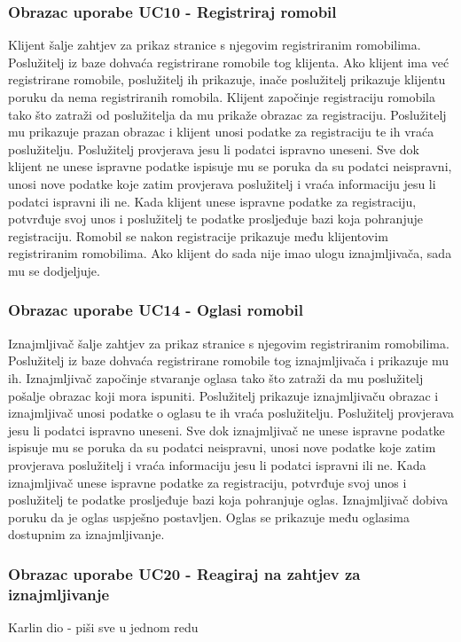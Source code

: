 				\subsubsection{Obrazac uporabe UC10 - Registriraj romobil}
						Klijent šalje zahtjev za prikaz stranice s njegovim registriranim romobilima. Poslužitelj iz baze dohvaća registrirane romobile tog klijenta. Ako klijent ima već registrirane romobile, poslužitelj ih prikazuje, inače poslužitelj prikazuje klijentu poruku da nema registriranih romobila. Klijent započinje registraciju romobila tako što zatraži od poslužitelja da mu prikaže obrazac za registraciju. Poslužitelj mu prikazuje prazan obrazac i klijent unosi podatke za registraciju te ih vraća poslužitelju. Poslužitelj provjerava jesu li podatci ispravno uneseni. Sve dok klijent ne unese ispravne podatke ispisuje mu se poruka da su podatci neispravni, unosi nove podatke koje zatim provjerava poslužitelj i vraća informaciju jesu li podatci ispravni ili ne. Kada klijent unese ispravne podatke za registraciju, potvrđuje svoj unos i poslužitelj te podatke prosljeđuje bazi koja pohranjuje registraciju. Romobil se nakon registracije prikazuje među klijentovim registriranim romobilima. Ako klijent do sada nije imao ulogu iznajmljivača, sada mu se dodjeljuje. 
				
				\eject

				\subsubsection{Obrazac uporabe UC14 - Oglasi romobil}
						Iznajmljivač šalje zahtjev za prikaz stranice s njegovim registriranim romobilima. Poslužitelj iz baze dohvaća registrirane romobile tog iznajmljivača i prikazuje mu ih. Iznajmljivač započinje stvaranje oglasa tako što zatraži da mu poslužitelj pošalje obrazac koji mora ispuniti. Poslužitelj prikazuje iznajmljivaču obrazac i iznajmljivač unosi podatke o oglasu te ih vraća poslužitelju. Poslužitelj provjerava jesu li podatci ispravno uneseni. Sve dok iznajmljivač ne unese ispravne podatke ispisuje mu se poruka da su podatci neispravni, unosi nove podatke koje zatim provjerava poslužitelj i vraća informaciju jesu li podatci ispravni ili ne. Kada iznajmljivač unese ispravne podatke za registraciju, potvrđuje svoj unos i poslužitelj te podatke prosljeđuje bazi koja pohranjuje oglas. Iznajmljivač dobiva poruku da je oglas uspješno postavljen. Oglas se prikazuje među oglasima dostupnim za iznajmljivanje.
				\eject

				\subsubsection{Obrazac uporabe UC20 - Reagiraj na zahtjev za iznajmljivanje}
						Karlin dio - piši sve u jednom redu
				\eject

